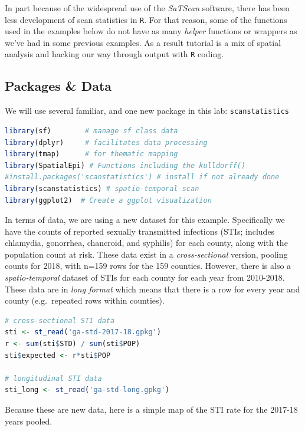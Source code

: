 \documentclass[
]{book}
\newcommand{\passthrough}[1]{#1}
\begin{document}
In part because of the widespread use of the \emph{SaTScan} software, there has been less development of scan statistics in \passthrough{\lstinline!R!}. For that reason, some of the functions used in the examples below do not have as many \emph{helper} functions or wrappers as we've had in some previous examples. As a result tutorial is a mix of spatial analysis and hacking our way through output with \passthrough{\lstinline!R!} coding.

\hypertarget{packages-data}{%
\subsection{Packages \& Data}\label{packages-data}}

We will use several familiar, and one new package in this lab: \passthrough{\lstinline!scanstatistics!}

\begin{lstlisting}[language=R]
library(sf)        # manage sf class data 
library(dplyr)     # facilitates data processing
library(tmap)      # for thematic mapping
library(SpatialEpi) # Functions including the kulldorff()
#install.packages('scanstatistics') # install if not already done
library(scanstatistics) # spatio-temporal scan
library(ggplot2)  # Create a ggplot visualization
\end{lstlisting}

In terms of data, we are using a new dataset for this example. Specifically we have the counts of reported sexually transmitted infections (STIs; includes chlamydia, gonorrhea, chancroid, and syphilis) for each county, along with the population count at risk. These data exist in a \emph{cross-sectional} version, pooling counts for 2018, with n=159 rows for the 159 counties. However, there is also a \emph{spatio-temporal} dataset of STIs for each county for each year from 2010-2018. These data are in \emph{long format} which means that there is a row for every year and county (e.g.~repeated rows within counties).

\begin{lstlisting}[language=R]
# cross-sectional STI data
sti <- st_read('ga-std-2017-18.gpkg') 
r <- sum(sti$STD) / sum(sti$POP)
sti$expected <- r*sti$POP

# longitudinal STI data
sti_long <- st_read('ga-std-long.gpkg')
\end{lstlisting}

Because these are new data, here is a simple map of the STI rate for the 2017-18 years pooled.
\end{document}
